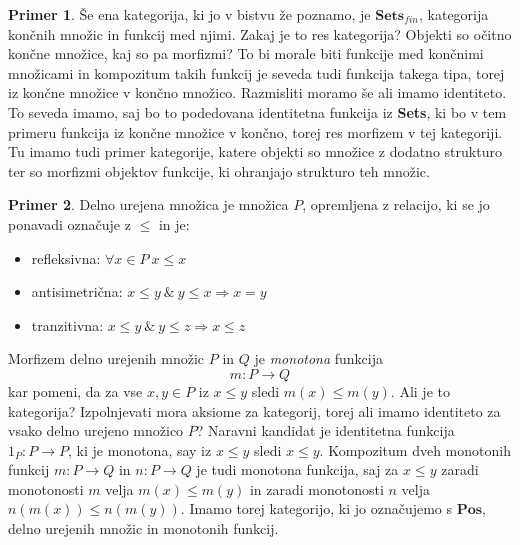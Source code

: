 \documentclass[12pt,a4paper]{book}
\theoremstyle{definition}
\theoremstyle{plain}
\theoremstyle{definition}
\newtheorem{primer}{Primer}[section]
\theoremstyle{remark}
\newcommand{\cat}[1]{\textbf{#1}}
\begin{document}
\begin{primer}
Še ena kategorija, ki jo v bistvu že poznamo, je $\cat{Sets}_{fin}$, kategorija končnih množic in funkcij med njimi. Zakaj je to res kategorija? Objekti so očitno končne množice, kaj so pa morfizmi? 
To bi morale biti funkcije med končnimi množicami in kompozitum takih funkcij je seveda tudi funkcija takega tipa, torej iz končne množice v končno množico. Razmisliti moramo še ali imamo identiteto. To seveda imamo, saj bo to podedovana identitetna funkcija iz \cat{Sets}, ki bo v tem primeru funkcija iz končne množice v končno, torej res morfizem v tej kategoriji. Tu imamo tudi primer kategorije, katere objekti so množice z dodatno strukturo ter so morfizmi objektov funkcije, ki ohranjajo strukturo teh množic.
\end{primer}

\begin{primer}
Delno urejena množica je množica $P$, opremljena z relacijo, ki se jo ponavadi označuje z $\leq$ in je:
\begin{itemize}
\item refleksivna: $\forall x \in P \ x \leq x$
\item antisimetrična: $x \leq y \ \& \ y \leq x \Rightarrow x = y$
\item tranzitivna: $x \leq y \ \& \ y \leq z \Rightarrow x \leq z$
\end{itemize}
Morfizem delno urejenih množic $P$ in $Q$ je \emph{monotona} funkcija
$$m : P \to Q$$
kar pomeni, da za vse $x,y \in P$ iz $x \leq y$ sledi $m(x) \leq m(y)$. Ali je to kategorija? Izpolnjevati mora aksiome za kategorij, torej ali imamo identiteto za vsako delno urejeno množico $P$? Naravni kandidat je identitetna funkcija $1_P : P \to P$, ki je monotona, say iz $x \leq y$ sledi $x \leq y$.
Kompozitum dveh monotonih funkcij $m : P \to Q$ in $n : P \to Q$ je tudi monotona funkcija, saj za $x \leq y$ zaradi monotonosti $m$ velja $m(x) \leq m(y)$ in zaradi monotonosti $n$ velja $n(m(x)) \leq n(m(y))$. Imamo torej kategorijo, ki jo označujemo s $\cat{Pos}$, delno urejenih množic in monotonih funkcij.
\end{primer}
\end{document}
